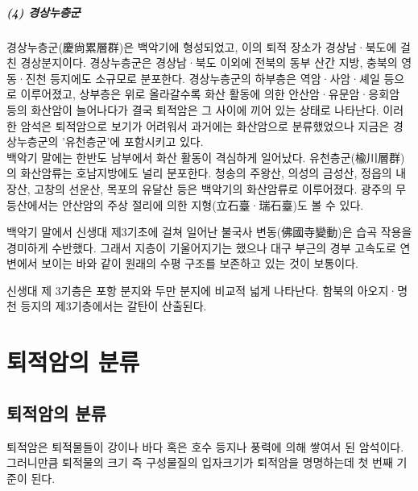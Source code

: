 \documentclass[12pt, a4paper, twoside]{book}
\begin{document}
			\paragraph{(4) 경상누층군}
			경상누층군(慶尙累層群)은 백악기에 형성되었고, 이의 퇴적 장소가 경상남·북도에 걸친 경상분지이다. 
			경상누층군은 경상남·북도 이외에 전북의 동부 산간 지방, 충북의 영동·진천 등지에도 소규모로 분포한다. 
			경상누층군의 하부층은 역암·사암·셰일 등으로 이루어졌고, 
			상부층은 위로 올라갈수록 화산 활동에 의한 안산암·유문암·응회암 등의 화산암이 늘어나다가 
			결국 퇴적암은 그 사이에 끼어 있는 상태로 나타난다.  
			이러한 암석은 퇴적암으로 보기가 어려워서 과거에는 화산암으로 분류했었으나 지금은 경상누층군의 '유천층군'에 포함시키고 있다.  \\


			백악기 말에는 한반도 남부에서 화산 활동이 격심하게 일어났다. 
			유천층군(楡川層群)의 화산암류는 호남지방에도 널리 분포한다.
			청송의 주왕산, 의성의 금성산, 정읍의 내장산, 고창의 선운산, 목포의 유달산 등은 백악기의 화산암류로 이루어졌다.
			광주의 무등산에서는 안산암의 주상 절리에 의한 지형(立石臺·瑞石臺)도 볼 수 있다.
 
			백악기 말에서 신생대 제3기초에 걸쳐 일어난 불국사 변동(佛國寺變動)은 습곡 작용을 경미하게 수반했다. 
			그래서 지층이 기울어지기는 했으나 대구 부근의 경부 고속도로 연변에서 보이는 바와 같이 원래의 수평 구조를 보존하고 있는 것이 보통이다. 

			신생대 제 3기층은 포항 분지와 두만 분지에 비교적 넓게 나타난다. 함북의 아오지·명천 등지의 제3기층에서는 갈탄이 산출된다. 





	\clearpage
	\chapter{퇴적암의 분류}
	\minitoc				%
	


	\clearpage
	\section{퇴적암의 분류}


		퇴적암은 퇴적물들이 강이나 바다 혹은 호수 등지나 풍력에 의해 쌓여서 된 암석이다.
		그러니만큼 퇴적물의 크기 즉 구성물질의 입자크기가 퇴적암을 명명하는데 첫 번째 기준이 된다.
\end{document}
